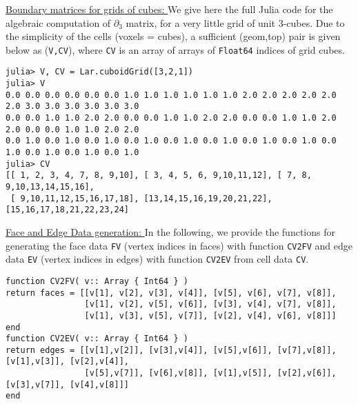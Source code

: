 \vspace{10pt}
\noindent\underline{
Boundary matrices for grids of cubes:
}\vspace{0.2em}\newline 
We give here the full Julia code for the algebraic computation of $\partial_3$ matrix, for a very little grid of unit
3-cubes. Due to the simplicity of the cells (voxels = cubes), a sufficient (geom,top) pair is given below
as (\texttt{V,CV}), where \texttt{CV} is an array of arrays of \texttt{Float64} indices of grid cubes.

\begin{Verbatim}[fontsize=\footnotesize]
julia> V, CV = Lar.cuboidGrid([3,2,1])
julia> V
0.0 0.0 0.0 0.0 0.0 0.0 1.0 1.0 1.0 1.0 1.0 1.0 2.0 2.0 2.0 2.0 2.0 2.0 3.0 3.0 3.0 3.0 3.0 3.0
0.0 0.0 1.0 1.0 2.0 2.0 0.0 0.0 1.0 1.0 2.0 2.0 0.0 0.0 1.0 1.0 2.0 2.0 0.0 0.0 1.0 1.0 2.0 2.0
0.0 1.0 0.0 1.0 0.0 1.0 0.0 1.0 0.0 1.0 0.0 1.0 0.0 1.0 0.0 1.0 0.0 1.0 0.0 1.0 0.0 1.0 0.0 1.0
julia> CV
[[ 1, 2, 3, 4, 7, 8, 9,10], [ 3, 4, 5, 6, 9,10,11,12], [ 7, 8, 9,10,13,14,15,16],
 [ 9,10,11,12,15,16,17,18], [13,14,15,16,19,20,21,22], [15,16,17,18,21,22,23,24]
\end{Verbatim}

\vspace{10pt}
\noindent\underline{
Face and Edge Data generation:
}\vspace{0.2em}\newline 
In the following, we provide the functions for generating the face data \texttt{FV} (vertex indices in faces) with function  \texttt{CV2FV} and edge data \texttt{EV} (vertex indices in edges) with function \texttt{CV2EV} from cell data \texttt{CV}. 



\begin{Verbatim}[fontsize=\footnotesize]
function CV2FV( v:: Array { Int64 } )
return faces = [[v[1], v[2], v[3], v[4]], [v[5], v[6], v[7], v[8]],
                [v[1], v[2], v[5], v[6]], [v[3], v[4], v[7], v[8]],
                [v[1], v[3], v[5], v[7]], [v[2], v[4], v[6], v[8]]]
end
function CV2EV( v:: Array { Int64 } )
return edges = [[v[1],v[2]], [v[3],v[4]], [v[5],v[6]], [v[7],v[8]], [v[1],v[3]], [v[2],v[4]],
                [v[5],v[7]], [v[6],v[8]], [v[1],v[5]], [v[2],v[6]], [v[3],v[7]], [v[4],v[8]]]
end
\end{Verbatim}

